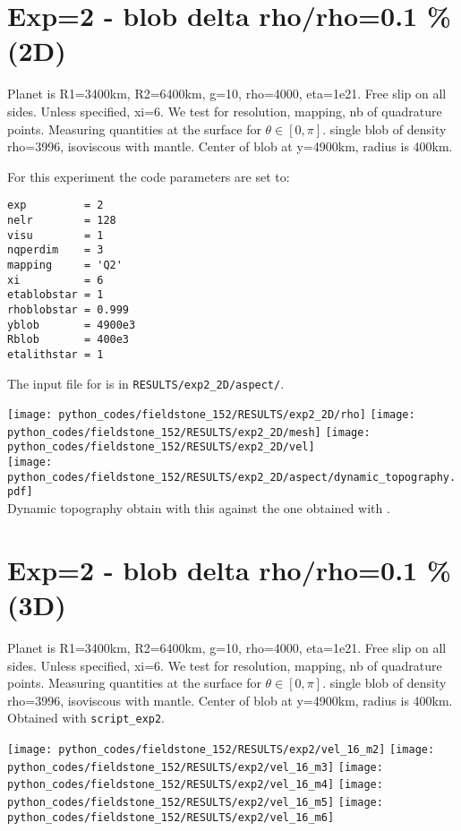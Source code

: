 \section*{Exp=2 - blob delta rho/rho=0.1 \% (2D)}

Planet is R1=3400km, R2=6400km, g=10, rho=4000, eta=1e21.
Free slip on all sides. Unless specified, xi=6.
We test for resolution, mapping, nb of quadrature points.
Measuring quantities at the surface for $\theta\in[0,\pi]$.
single blob of density rho=3996, isoviscous with mantle.
Center of blob at y=4900km, radius is 400km.

For this experiment the code parameters are set to:
\begin{lstlisting}
exp         = 2
nelr        = 128 
visu        = 1
nqperdim    = 3
mapping     = 'Q2' 
xi          = 6
etablobstar = 1
rhoblobstar = 0.999
yblob       = 4900e3
Rblob       = 400e3
etalithstar = 1
\end{lstlisting}

The input file for \aspect{} is in {\tt RESULTS/exp2\_2D/aspect/}.


\begin{center}
\texttt{[image: python\_codes/fieldstone\_152/RESULTS/exp2\_2D/rho]}
\texttt{[image: python\_codes/fieldstone\_152/RESULTS/exp2\_2D/mesh]}
\texttt{[image: python\_codes/fieldstone\_152/RESULTS/exp2\_2D/vel]}\\
\texttt{[image: python\_codes/fieldstone\_152/RESULTS/exp2\_2D/aspect/dynamic\_topography.pdf]}\\
{\captionfont Dynamic topography obtain with this \stone against the one obtained with \aspect.}
\end{center}



\newpage
\section*{Exp=2 - blob delta rho/rho=0.1 \% (3D)}

Planet is R1=3400km, R2=6400km, g=10, rho=4000, eta=1e21.
Free slip on all sides. Unless specified, xi=6.
We test for resolution, mapping, nb of quadrature points.
Measuring quantities at the surface for $\theta\in[0,\pi]$.
single blob of density rho=3996, isoviscous with mantle.
Center of blob at y=4900km, radius is 400km.
Obtained with {\tt script\_exp2}.

\noindent
\texttt{[image: python\_codes/fieldstone\_152/RESULTS/exp2/vel\_16\_m2]}
\texttt{[image: python\_codes/fieldstone\_152/RESULTS/exp2/vel\_16\_m3]}
\texttt{[image: python\_codes/fieldstone\_152/RESULTS/exp2/vel\_16\_m4]}
\texttt{[image: python\_codes/fieldstone\_152/RESULTS/exp2/vel\_16\_m5]}
\texttt{[image: python\_codes/fieldstone\_152/RESULTS/exp2/vel\_16\_m6]}

